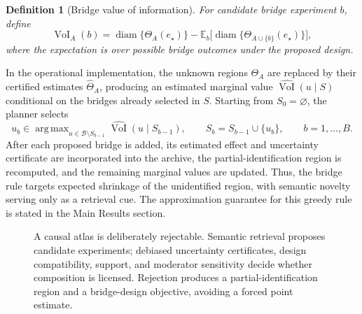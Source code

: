 \documentclass[11pt]{article}
\numberwithin{equation}{section}
\newtheorem{definition}{Definition}[section]
\DeclareMathOperator{\diam}{diam}
\DeclareMathOperator*{\argmax}{arg\,max}
\newcommand{\E}{\mathbb E}
\newcommand{\1}{\mathbf 1}
\newcommand{\cB}{\mathcal B}
\begin{document}
\begin{definition}[Bridge value of information]
For candidate bridge experiment \(b\), define
\[
  \operatorname{VoI}_A(b)
  =
  \diam\{\Theta_A(e_\star)\}
  -
  \E_b\big[\diam\{\Theta_{A\cup\{b\}}(e_\star)\}\big],
\]
where the expectation is over possible bridge outcomes under the proposed design.
\end{definition}

In the operational implementation, the unknown regions \(\Theta_A\) are replaced by their certified estimates \(\widehat\Theta_A\), producing an estimated marginal value \(\widehat{\operatorname{VoI}}(u\mid S)\) conditional on the bridges already selected in \(S\).  Starting from \(S_0=\varnothing\), the planner selects
\[
  u_b\in\argmax_{u\in\cB\setminus S_{b-1}}
  \widehat{\operatorname{VoI}}(u\mid S_{b-1}),
  \qquad
  S_b=S_{b-1}\cup\{u_b\},
  \qquad b=1,\ldots,B.
\]
After each proposed bridge is added, its estimated effect and uncertainty certificate are incorporated into the archive, the partial-identification region is recomputed, and the remaining marginal values are updated.  Thus, the bridge rule targets expected shrinkage of the unidentified region, with semantic novelty serving only as a retrieval cue.  The approximation guarantee for this greedy rule is stated in the Main Results section.

\begin{figure}[t]
\centering
{}
\caption{A causal atlas is deliberately rejectable.  Semantic retrieval proposes candidate experiments; debiased uncertainty certificates, design compatibility, support, and moderator sensitivity decide whether composition is licensed.  Rejection produces a partial-identification region and a bridge-design objective, avoiding a forced point estimate.}
\label{fig:pipeline}
\end{figure}
\end{document}
